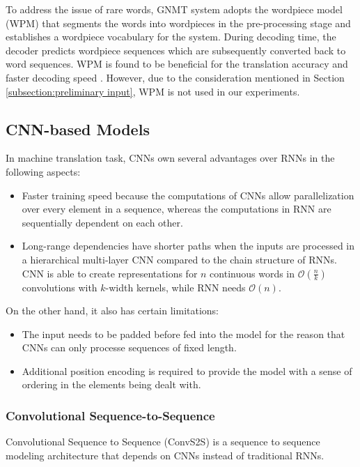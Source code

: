 To address the issue of rare words, GNMT system adopts the wordpiece model (WPM) that segments the words into wordpieces in the pre-processing stage and establishes a wordpiece vocabulary for the system. During decoding time, the decoder predicts wordpiece sequences which are subsequently converted back to word sequences. WPM is found to be beneficial for the translation accuracy and faster decoding speed \cite{Wu2016}. However, due to the consideration mentioned in Section \ref{subsection:preliminary input}, WPM is not used in our experiments. 

\subsection{CNN-based Models} \label{subsection:cnn-based models}

In machine translation task, CNNs own several advantages over RNNs in the following aspects:
\begin{itemize}
\item Faster training speed because the computations of CNNs allow parallelization over every element in a sequence, whereas the computations in RNN are sequentially dependent on each other.
\item Long-range dependencies have shorter paths when the inputs are processed in a hierarchical multi-layer CNN compared to the chain structure of RNNs. CNN is able to create representations for $ n $ continuous words in $ \mathcal{O}(\frac{n}{k}) $ convolutions with $ k $-width kernels, while RNN needs $ \mathcal{O}(n) $.
\end{itemize}
On the other hand, it also has certain limitations:
\begin{itemize}
\item The input needs to be padded before fed into the model for the reason that CNNs can only processe sequences of fixed length.
\item Additional position encoding is required to provide the model with a sense of ordering in the elements being dealt with.
\end{itemize}

\subsubsection*{Convolutional Sequence-to-Sequence}

Convolutional Sequence to Sequence (ConvS2S) \cite{gehring2017convs2s} is a sequence to sequence modeling architecture that depends on CNNs instead of traditional RNNs. 

